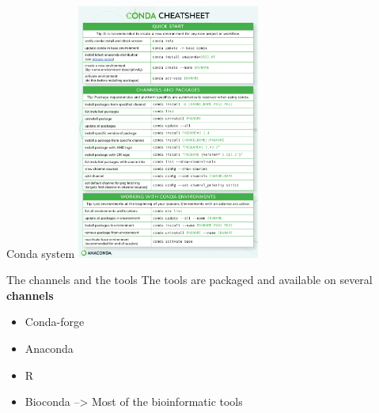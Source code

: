\begin{frame}{Conda system}
\centering\includegraphics[width=0.45\textwidth]{images/conda_sheet_4.12.pdf}
\end{frame}
\begin{frame}{The channels and the tools}
The tools are packaged and available on several \textbf{channels}
\begin{minipage}[t]{0.48\linewidth}
\begin{itemize}[<2->]
\item Conda-forge
\item Anaconda
\end{itemize}
\end{minipage}
\begin{minipage}[t]{0.48\linewidth}
\begin{itemize}[<2->]
\item R
\item Bioconda --> Most of the bioinformatic tools
\end{itemize}
\end{minipage}
\end{frame}


